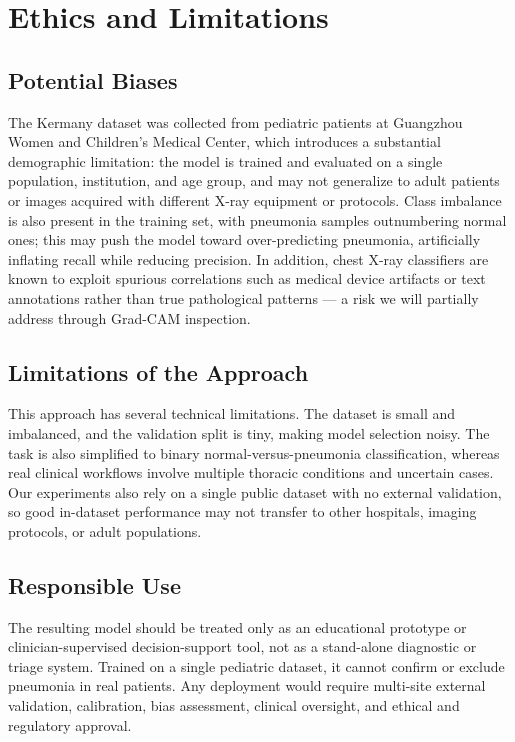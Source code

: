 \documentclass[acmsmall,screen,nonacm]{acmart}
\begin{document}
\section{Ethics and Limitations}

\subsection{Potential Biases}
The Kermany dataset was collected from pediatric patients at Guangzhou Women and Children's Medical Center, which introduces a substantial demographic limitation: the model is trained and evaluated on a single population, institution, and age group, and may not generalize to adult patients or images acquired with different X-ray equipment or protocols. Class imbalance is also present in the training set, with pneumonia samples outnumbering normal ones; this may push the model toward over-predicting pneumonia, artificially inflating recall while reducing precision. In addition, chest X-ray classifiers are known to exploit spurious correlations such as medical device artifacts or text annotations rather than true pathological patterns — a risk we will partially address through Grad-CAM inspection.

\subsection{Limitations of the Approach}
This approach has several technical limitations. The dataset is small and imbalanced, and the validation split is tiny, making model selection noisy. The task is also simplified to binary normal-versus-pneumonia classification, whereas real clinical workflows involve multiple thoracic conditions and uncertain cases. Our experiments also rely on a single public dataset with no external validation, so good in-dataset performance may not transfer to other hospitals, imaging protocols, or adult populations.

\subsection{Responsible Use}
The resulting model should be treated only as an educational prototype or clinician-supervised decision-support tool, not as a stand-alone diagnostic or triage system. Trained on a single pediatric dataset, it cannot confirm or exclude pneumonia in real patients. Any deployment would require multi-site external validation, calibration, bias assessment, clinical oversight, and ethical and regulatory approval.



\end{document}
